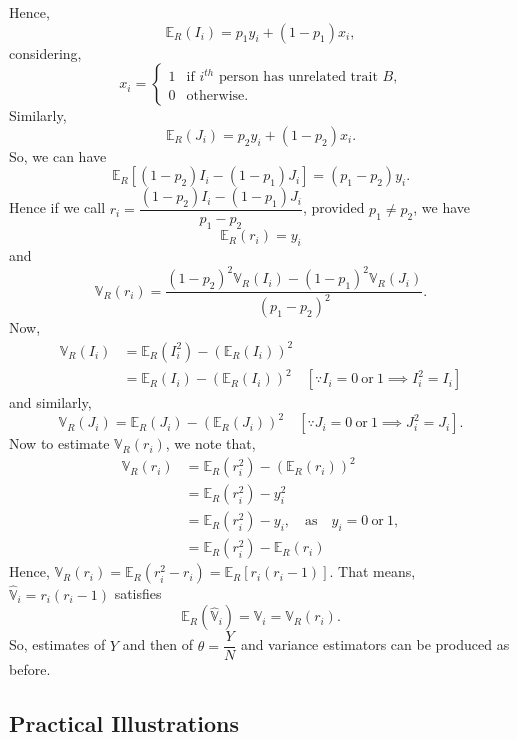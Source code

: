 \documentclass[12pt]{article}
\newcommand{\E}{\mathbb{E}}
\newcommand{\Var}{\mathbb{V}}
\theoremstyle{definition}
\begin{document}
Hence,
$$\E_R(I_i)=p_1y_i+(1-p_1)x_i,$$
considering,
$$x_i = \begin{cases}
1 & \text{if $i^{th}$ person has unrelated trait $B$,}\\
0 & \text{otherwise.}
\end{cases}$$
Similarly,
$$\E_R(J_i)=p_2y_i+(1-p_2)x_i.$$
So, we can have
$$\E_R[(1-p_2)I_i-(1-p_1)J_i]=(p_1-p_2)y_i.$$
Hence if we call $r_i=\dfrac{(1-p_2)I_i-(1-p_1)J_i}{p_1-p_2}$, provided $p_1 \neq p_2$, we have 
$$\E_R(r_i)=y_i$$
and
$$\Var_R(r_i)=\dfrac{(1-p_2)^2 \Var_R(I_i)-(1-p_1)^2 \Var_R( J_i)}{(p_1-p_2)^2}.$$
Now, 
\begin{align*}
   \Var_R(I_i) & = \E_R(I_i^2) - (\E_R(I_i))^2\\
   & = \E_R(I_i)-(\E_R(I_i))^2 \quad [\because I_i=0\ \text{or}\ 1 \implies I_i^2=I_i]
\end{align*}
and similarly,
$$\Var_R(J_i)= \E_R(J_i)-(\E_R(J_i))^2\quad [\because J_i=0\ \text{or}\ 1 \implies J_i^2=J_i].$$
Now to estimate $\Var_R(r_i)$, we note that,
\begin{align*}
    \Var_R(r_i) & = \E_R(r_i^2) - (\E_R(r_i))^2\\
    & = \E_R(r_i^2)-y_i^2\\
    & = \E_R(r_i^2)-y_i, \quad \text{as}\quad  y_i=0\ \text{or}\ 1, \\
    & = \E_R(r_i^2)-\E_R(r_i)
\end{align*}
Hence, $\Var_R(r_i)=\E_R(r_i^2-r_i)= \E_R[r_i(r_i-1)]$. That means, $\hat{\Var}_i=r_i(r_i-1)$ satisfies 
$$\E_R\left(\hat{\Var}_i\right)=\Var_i=\Var_R(r_i).$$
So, estimates of $Y$ and then of $\theta=\dfrac{Y}{N}$ and variance estimators can be produced as before.

\subsection{Practical Illustrations}
\end{document}
